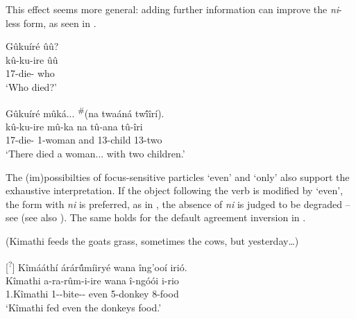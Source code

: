 \documentclass[output=paper]{langscibook}
\begin{document}
\z

This effect seems more general: adding further information can improve the \textit{ni}-less form, as seen in .

\ea
\label{bkm:Ref125200264}
Gûkuíré ûû?\\
\gll
kû-ku-ire   ûû\\
17\SM{}-die-\PFV{}   who\\
\glt
‘Who died?’

\sn
Gûkuíré mûká...  \textsuperscript{\#}(na twaáná tw\'{î}îrí).\\
\gll
kû-ku-ire   mû-ka   na   tû-ana   tû-îri\\
17\SM{}-die-\PFV{}   1-woman   and   13-child   13-two\\
\glt
‘There died a woman... with two children.’

\z

The (im)possibilties of focus-sensitive particles ‘even’ and ‘only’ also support the exhaustive interpretation. If the object following the verb is modified by ‘even’, the form with \textit{ni} is preferred, as in , the absence of \textit{ni} is judged to be degraded -- see  (see also \citealt[714]{AbelsMuriungi2008}). The same holds for the default agreement inversion in .

\ea
\label{bkm:Ref125200361}(Kimathi feeds the goats grass, sometimes the cows, but yesterday…)

\ex
[\textsuperscript{?}]{
\label{bkm:Ref125200361:b}
Kîmááthí árár\'{û}míiryé wana îng’ooí irió.\\
\gll
Kîmathi  a-ra-rûm-i-ire  wana  î-ngóói  i-rio\\
1.Kîmathi 1\SM-\YPST{}-bite-\IC-\PFV{} even  5-donkey  8-food\\
\glt
‘Kîmathi fed even the donkeys food.’
}
\end{document}
